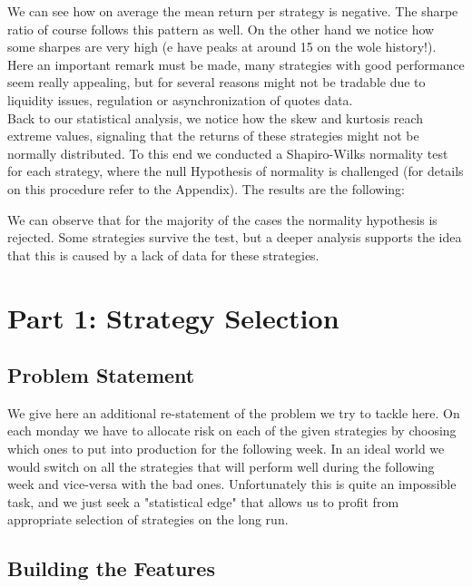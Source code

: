 \documentclass[a4paper]{article}
\begin{document}
We can see how on average the mean return per strategy is negative. The sharpe ratio of course follows this pattern as well. On the other hand we notice how some sharpes are very high (e have peaks at around 15 on the wole history!). Here an important remark must be made, many strategies with good performance seem really appealing, but for several reasons might not be tradable due to liquidity issues, regulation or asynchronization of quotes data.\\
Back to our statistical analysis, we notice how the skew and kurtosis reach extreme values, signaling that the returns of these strategies might not be normally distributed. To this end we conducted a Shapiro-Wilks normality test for each strategy, where the null Hypothesis of normality is challenged (for details on this procedure refer to the Appendix). The results are the following:

We can observe that for the majority of the cases the normality hypothesis is rejected. Some strategies survive the test, but a deeper analysis supports the idea that this is caused by a lack of data for these strategies. 

\section*{Part 1: Strategy Selection}

\subsection*{Problem Statement}

We give here an additional re-statement of the problem we try to tackle here. On each monday we have to allocate risk on each of the given strategies by choosing which ones to put into production for the following week. In an ideal world we would switch on all the strategies that will perform well during the following week and vice-versa with the bad ones. Unfortunately this is quite an impossible task, and we just seek a "statistical edge" that allows us to profit from appropriate selection of strategies on the long run.\\

\subsection*{Building the Features}
\end{document}
